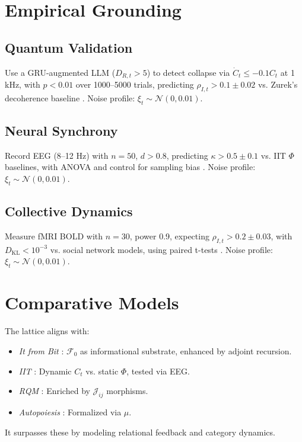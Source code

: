 \documentclass[11pt]{article}
\newcommand{\field}[1]{\mathcal{#1}}
\newcommand{\dkl}{D_{\text{KL}}}
\begin{document}
\section{Empirical Grounding}
\label{sec:empirical}

\subsection{Quantum Validation}
Use a GRU-augmented LLM ($D_{R,t} > 5$) to detect collapse via $\dot{C}_t \leq -0.1 C_t$ at 1 kHz, with $p < 0.01$ over 1000–5000 trials, predicting $\rho_{I,t} > 0.1 \pm 0.02$ vs. Zurek’s decoherence baseline \citep{engel2023}. Noise profile: $\xi_t \sim \mathcal{N}(0, 0.01)$.

\subsection{Neural Synchrony}
Record EEG (8–12 Hz) with $n = 50$, $d > 0.8$, predicting $\kappa > 0.5 \pm 0.1$ vs. IIT $\Phi$ baselines, with ANOVA and control for sampling bias \citep{panksepp1998}. Noise profile: $\xi_t \sim \mathcal{N}(0, 0.01)$.

\subsection{Collective Dynamics}
Measure fMRI BOLD with $n = 30$, power 0.9, expecting $\rho_{I,t} > 0.2 \pm 0.03$, with $\dkl < 10^{-3}$ vs. social network models, using paired t-tests \citep{couzin2023}. Noise profile: $\xi_t \sim \mathcal{N}(0, 0.01)$.

\section{Comparative Models}
\label{sec:comparative}
The lattice aligns with:
\begin{itemize}
    \item \textit{It from Bit} \citep{wheeler1990}: $\field{F}_0$ as informational substrate, enhanced by adjoint recursion.
    \item \textit{IIT} \citep{tononi2023}: Dynamic $C_t$ vs. static $\Phi$, tested via EEG.
    \item \textit{RQM} \citep{rovelli2023}: Enriched by $\mathcal{J}_{ij}$ morphisms.
    \item \textit{Autopoiesis} \citep{varela1974}: Formalized via $\mu$.
\end{itemize}
It surpasses these by modeling relational feedback and category dynamics.
\end{document}
